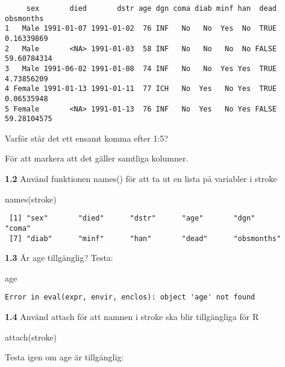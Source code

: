 \documentclass[
  letterpaper,
  DIV=11,
  numbers=noendperiod]{scrartcl}
\newenvironment{Shaded}{\begin{snugshade}}{\end{snugshade}}
\newcommand{\FunctionTok}[1]{\textcolor[rgb]{0.28,0.35,0.67}{#1}}
\newcommand{\NormalTok}[1]{\textcolor[rgb]{0.00,0.23,0.31}{#1}}
\begin{document}
\begin{verbatim}
     sex       died       dstr age dgn coma diab minf han  dead   obsmonths
1   Male 1991-01-07 1991-01-02  76 INF   No   No  Yes  No  TRUE  0.16339869
2   Male       <NA> 1991-01-03  58 INF   No   No   No  No FALSE 59.60784314
3   Male 1991-06-02 1991-01-08  74 INF   No   No  Yes Yes  TRUE  4.73856209
4 Female 1991-01-13 1991-01-11  77 ICH   No  Yes   No Yes  TRUE  0.06535948
5 Female       <NA> 1991-01-13  76 INF   No  Yes   No Yes FALSE 59.28104575
\end{verbatim}

Varför står det ett ensamt komma efter 1:5?

För att markera att det gäller samtliga kolumner.

\textbf{1.2} Använd funktionen names() för att ta ut en lista på
variabler i stroke

\begin{Shaded}
\begin{Highlighting}[]
\FunctionTok{names}\NormalTok{(stroke)}
\end{Highlighting}
\end{Shaded}

\begin{verbatim}
 [1] "sex"       "died"      "dstr"      "age"       "dgn"       "coma"     
 [7] "diab"      "minf"      "han"       "dead"      "obsmonths"
\end{verbatim}

\textbf{1.3} Är age tillgänglig? Testa:

\begin{Shaded}
\begin{Highlighting}[]
\NormalTok{age}
\end{Highlighting}
\end{Shaded}

\begin{verbatim}
Error in eval(expr, envir, enclos): object 'age' not found
\end{verbatim}

\textbf{1.4} Använd attach för att namnen i stroke ska blir tillgängliga
för R

\begin{Shaded}
\begin{Highlighting}[]
\FunctionTok{attach}\NormalTok{(stroke)}
\end{Highlighting}
\end{Shaded}

Testa igen om age är tillgänglig:
\end{document}
